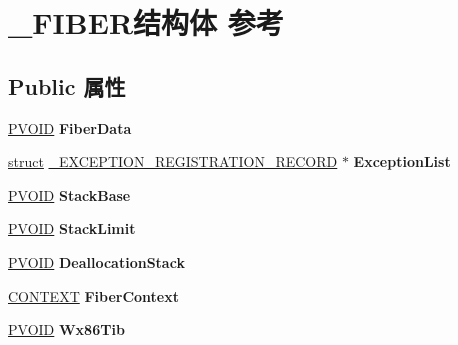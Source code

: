 \hypertarget{struct___f_i_b_e_r}{}\section{\+\_\+\+F\+I\+B\+E\+R结构体 参考}
\label{struct___f_i_b_e_r}
\subsection*{Public 属性}
\begin{DoxyCompactItemize}
\item 
\mbox{\label{struct___f_i_b_e_r_ae289050560841363745d4716085331c2}} 
\hyperlink{interfacevoid}{P\+V\+O\+ID} {\bfseries Fiber\+Data}
\item 
\mbox{\label{struct___f_i_b_e_r_ae08a6bfd5277ec8efd6fff7c339746bc}} 
\hyperlink{interfacestruct}{struct} \hyperlink{struct___e_x_c_e_p_t_i_o_n___r_e_g_i_s_t_r_a_t_i_o_n___r_e_c_o_r_d}{\+\_\+\+E\+X\+C\+E\+P\+T\+I\+O\+N\+\_\+\+R\+E\+G\+I\+S\+T\+R\+A\+T\+I\+O\+N\+\_\+\+R\+E\+C\+O\+RD} $\ast$ {\bfseries Exception\+List}
\item 
\mbox{\label{struct___f_i_b_e_r_a99e88f9f082819a881d3177b568a551d}} 
\hyperlink{interfacevoid}{P\+V\+O\+ID} {\bfseries Stack\+Base}
\item 
\mbox{\label{struct___f_i_b_e_r_a006fa96d7ccfcafe8658c99231bcaa4d}} 
\hyperlink{interfacevoid}{P\+V\+O\+ID} {\bfseries Stack\+Limit}
\item 
\mbox{\label{struct___f_i_b_e_r_a59701a3d5b6c5275a9e687b628fd5079}} 
\hyperlink{interfacevoid}{P\+V\+O\+ID} {\bfseries Deallocation\+Stack}
\item 
\mbox{\label{struct___f_i_b_e_r_a3fc4d944a5ffc750a915f9f5de39f319}} 
\hyperlink{struct___c_o_n_t_e_x_t}{C\+O\+N\+T\+E\+XT} {\bfseries Fiber\+Context}
\item 
\mbox{\label{struct___f_i_b_e_r_a59ec5d3cad903a8199b7c4232cfb40c8}} 
\hyperlink{interfacevoid}{P\+V\+O\+ID} {\bfseries Wx86\+Tib}
\item 
\mbox{\label{struct___f_i_b_e_r_ac896822a819bb73bcebf02769d1dcf8a}} 

\end{DoxyCompactItemize}
